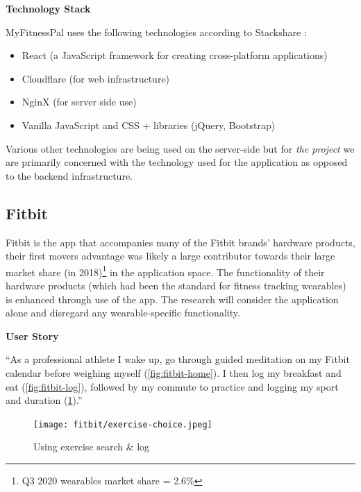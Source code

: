 \textbf{Technology Stack}
\label{research-breakdown:mfp-stack}
\par
MyFitnessPal uses the following technologies according to Stackshare \cite{mfp-stack}:
\begin{itemize}
	\item React (a JavaScript framework for creating cross-platform applications)
	\item Cloudflare (for web infrastructure)
	\item NginX (for server side use)
	\item Vanilla JavaScript and CSS + libraries (jQuery, Bootstrap)
\end{itemize}
Various other technologies are being used on the server-side but for \textit{the project}
we are primarily concerned with the technology used for the application
as opposed to the backend infrastructure.


\subsection{Fitbit}
Fitbit is the app that accompanies many of the Fitbit brands'
hardware products, their first movers advantage was likely
a large contributor towards their large market share (in 2018)\footnote{Q3 2020 wearables market share = 2.6\%\cite{fitbit-market-share}}
in the application space.
The functionality of their hardware products (which had been the standard for
fitness tracking wearables)
is enhanced through use of the app. The research will consider the application alone and disregard
any wearable-specific functionality.
\pagebreak

\textbf{User Story}
\label{research-breakdown:fitbit-usr-story}
\par
``As a professional athlete I wake up, go through guided meditation on my Fitbit calendar before weighing myself (\cref{fig:fitbit-home}).
I then log my breakfast and eat (\cref{fig:fitbit-log}), followed by my commute to practice
and logging my sport and duration (\cref{fig:fitbit-exercise-log}).''

\begin{figure}[H]
	\centering
	\texttt{[image: fitbit/exercise-choice.jpeg]}
	\caption{Using exercise search \& log}
	\label{fig:fitbit-exercise-log}
\end{figure}
\pagebreak


